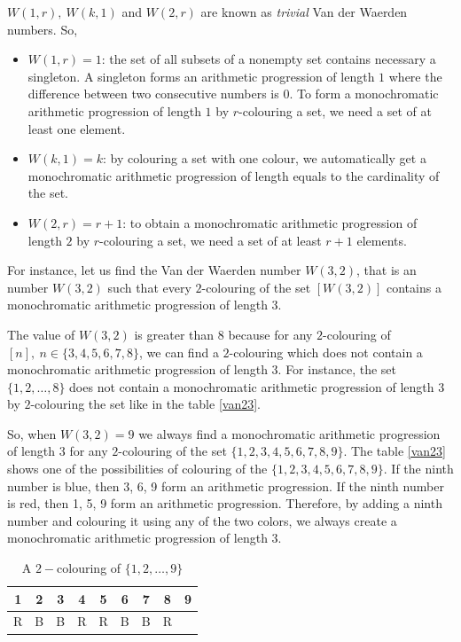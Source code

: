 $W(1,r), \ W(k,1)$ and $W(2,r)$ are known as \textit{trivial} Van der Waerden numbers. So, 
\begin{itemize}
\item $W(1,r)=1$:  the set of all subsets of a nonempty set contains necessary a singleton. A singleton forms an arithmetic progression of length $1$ where the difference between two consecutive numbers is $0.$ To form a monochromatic arithmetic progression of length $1$ by $r$-colouring a set, we need  a set of at least one element. 
\item $W(k,1)=k$: by colouring a set with one colour, we automatically get a monochromatic arithmetic progression of length equals to the cardinality  of the set.
\item $W(2,r)=r+1$: to obtain a monochromatic arithmetic progression of length $2$ by $r$-colouring a set, we need a set of at least $r+1$ elements.
\end{itemize}

For instance, let us find the Van der Waerden number $W(3,2)$, that is an number $W(3,2)$ such that every $2$-colouring  of the set $[W(3,2)]$ contains a monochromatic arithmetic progression of length $3.$

The value of $W(3,2)$ is greater than $8$ because for any $2$-colouring of $[n],\ n\in \{3,4,5,6,7,8\}$, we can find a $2$-colouring which does not contain a monochromatic arithmetic progression of length 3. For instance, the set  $\{1,2,\ldots, 8\}$ does not contain a monochromatic  arithmetic progression of length $3$ by $2$-colouring the set  like in the table \eqref{van23}.

So, when $W(3,2)=9$ we always find a monochromatic arithmetic progression of length 3 for any $2$-colouring of the set  $\{1,2,3,4,5,6,7,8,9\}.$ The table \eqref{van23} shows one of the possibilities of colouring of the  $\{1,2,3,4,5,6,7,8,9\}.$  If the ninth number is {\color{blue} blue}, then{ \color{blue}3, 6, 9}  form an arithmetic progression. If the ninth number is {\color{red} red}, then {\color{red}1, 5, 9} form an arithmetic progression. Therefore, by adding a ninth number and colouring it using any of the two colors, we always create  a monochromatic arithmetic progression of length 3.

\begin{table}[h]
\begin{center}
\begin{tabular}{ccccccccc}
\hline
1 & 2 & 3 & 4  & 5 & 6 & 7 & 8 & 9 \\ \hline
\color{red}R & \color{blue}B & \color{blue}B & \color{red}R & \color{red}R & \color{blue}B & \color{blue}B & \color{red}R  & \\
\hline 
\end{tabular} 
\end{center}
\caption{A $2-$colouring of $\{1,2,\ldots, 9\}$} \label{van23}
\end{table}

